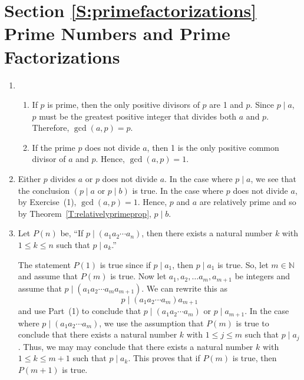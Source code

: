 \section*{Section \ref{S:primefactorizations} Prime Numbers and Prime Factorizations}

\begin{enumerate}
\item \begin{enumerate}
\item If $p$ is prime, then the only positive divisors of $p$ are 1 and $p$.  Since $p \mid a$, $p$ must be the greatest positive integer that divides both $a$ and $p$.  Therefore, 
$\gcd \left( a, p \right) = p$.

\item If the prime $p$ does not divide $a$, then 1 is the only positive common divisor of $a$ and 
$p$.  Hence, $\gcd \left( a, p \right) = 1$.
\end{enumerate}

\item Either $p$ divides $a$ or $p$ does not divide $a$.  In the case where $p \mid a$, we see that the conclusion $\left( p \mid a \text{ or } p \mid b \right)$ is true.  In the case where 
$p$ does not divide $a$, by Exercise~(1), $\gcd \left( a , p \right) = 1$.  Hence, $p$ and $a$ are relatively prime and so by Theorem~\ref{T:relativelyprimeprop}, $p \mid b$.

\item Let $P \left( n \right)$ be, ``If $p \mid \left( {a_1 a_2  \cdots a_n } \right)$, then there exists a natural number $k$  with  $1 \leq k \leq n$ such that  $p \mid a_k $.''

The statement $P \left( 1 \right)$ is true since if $p \mid a_1$, then $p \mid a_1$ is true.  So, let $m \in \mathbb{N}$ and assume that $P \left( m \right)$ is true.  Now let 
$a_1, a_2, \ldots a_m, a_{m+1}$ be integers and assume that 
$p \mid \left( {a_1 a_2  \cdots a_m a_{m+1} } \right)$.  We can rewrite this as
\[
p \mid \left( a_1 a_2  \cdots a_m \right) a_{m+1} 
\]
and use Part~(1) to conclude that $p \mid \left( a_1 a_2  \cdots a_m \right)$ or $p \mid a_{m+1}$.  In the case where $p \mid \left( a_1 a_2  \cdots a_m \right)$, we use the assumption that 
$P \left( m \right)$ is true to conclude that there exists a natural number $k$  with  
$1 \leq j \leq m$ such that  $p \mid a_j$.  Thus, we may may conclude that there exists a natural number $k$  with  $1 \leq k \leq m +1$  such that  $p \mid a_k$.  This proves that if 
$P \left( m \right)$ is true, then $P \left( m + 1 \right)$ is true.


\end{enumerate}
